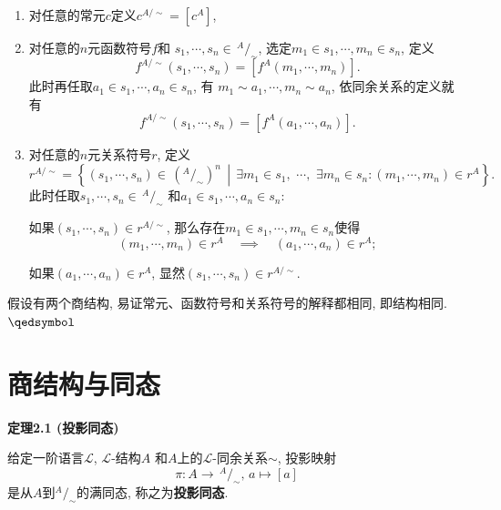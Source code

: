 
\begin{enumerate}
    \item 对任意的常元$c$定义$c^{A/\sim}=[c^A]$,
    \item 对任意的$n$元函数符号$f$和
    $s_1,\cdots,s_n\in\,\!^{\displaystyle A}\!/_{\displaystyle\sim}$,
    选定$m_1\in s_1,\cdots,m_n\in s_n$, 定义
    \[
        f^{A/\sim}(s_1,\cdots,s_n)=[f^A(m_1,\cdots,m_n)].
    \]
    此时再任取$a_1\in s_1,\cdots,a_n\in s_n$, 有
    $m_1\sim a_1,\cdots,m_n\sim a_n$, 依同余关系的定义就有
    \[
        f^{A/\sim}(s_1,\cdots,s_n)=[f^A(a_1,\cdots,a_n)].
    \]
    \item 对任意的$n$元关系符号$r$, 定义
    \[
        r^{A/\sim}=\left\{(s_1,\cdots,s_n)\in\,\!
        \left(^{\displaystyle A}\!/_{\displaystyle\sim}\right)^n\,\middle\vert\,
        \exists m_1\in s_1,\,\,\cdots,\,\,\exists m_n\in s_n:
        (m_1,\cdots,m_n)\in r^A\right\}.
    \]
    此时任取$s_1,\cdots,s_n\in\,\!^{\displaystyle A}\!/_{\displaystyle\sim}$
    和$a_1\in s_1,\cdots,a_n\in s_n$:

    \hspace{2.17em}
    如果$(s_1,\cdots,s_n)\in r^{A/\sim}$,
    那么存在$m_1\in s_1,\cdots,m_n\in s_n$使得
    \[
        (m_1,\cdots,m_n)\in r^A\quad\implies\quad(a_1,\cdots,a_n)\in r^A;
    \]

    \hspace{2.17em}
    如果$(a_1,\cdots,a_n)\in r^A$, 显然$(s_1,\cdots,s_n)\in r^{A/\sim}$.
\end{enumerate}


假设有两个商结构, 易证常元、函数符号和关系符号的解释都相同, 即结构相同.
\hfill $\qedsymbol$





\newpage

\section{商结构与同态}

\hypertarget{sec:定理2.1}{}
\noindent\textbf{定理2.1 (投影同态)}

给定一阶语言$\mathcal{L}$, $\mathcal{L}$-结构$A$
和$A$上的$\mathcal{L}$-同余关系$\sim$, 投影映射
\[
    \pi:A\to\,^{\displaystyle A}\!/_{\displaystyle\sim},\,a\mapsto[a]
\]
是从$A$到$^{\displaystyle A}\!/_{\displaystyle\sim}$的满同态,
称之为\textbf{投影同态}.

